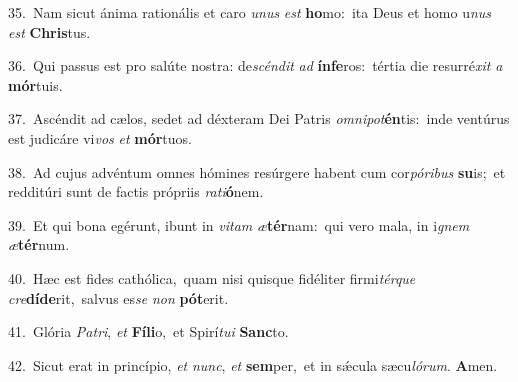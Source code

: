 {\numbfont\textcolor{\numbcolor}{35.}}~Nam sicut ánima rationális et caro \textit{u}\-\textit{nus} \textit{est} \textbf{ho}\-mo:~\star ita Deus et homo u\textit{nus} \textit{est} \textbf{Chris}\-tus.\par
{\numbfont\textcolor{\numbcolor}{36.}}~Qui passus est pro salúte nostra: de\-\textit{scén}\-\textit{dit} \textit{ad} \textbf{ín}\-\textbf{fe}ros:~\star tértia die resurré\textit{xit} \textit{a} \textbf{mór}\-tuis.\par
{\numbfont\textcolor{\numbcolor}{37.}}~Ascéndit ad cælos, sedet ad déxteram Dei Patris \textit{om}\-\textit{ni}\textit{pot}\textbf{én}tis:~\star inde ventúrus est judicáre vi\textit{vos} \textit{et} \textbf{mór}\-tuos.\par
{\numbfont\textcolor{\numbcolor}{38.}}~Ad cujus advéntum omnes hómines resúrgere habent cum cor\-\textit{pó}\-\textit{ri}\textit{bus} \textbf{su}\-is;~\star et redditúri sunt de factis própriis \textit{ra}\-\textit{ti}\textbf{ó}nem.\par
{\numbfont\textcolor{\numbcolor}{39.}}~Et qui bona egérunt, ibunt in \textit{vi}\-\textit{tam} \textit{æ}\-\textbf{tér}nam:~\star qui vero mala, in i\textit{gnem} \textit{æ}\-\textbf{tér}num.\par
{\numbfont\textcolor{\numbcolor}{40.}}~Hæc est fides cathólica,~\dagger quam nisi quisque fidéliter firmi\-\textit{tér}\-\textit{que} \textit{cre}\-\textbf{dí}\textbf{de}rit,~\star salvus es\textit{se} \textit{non} \textbf{pót}\-erit.\par
{\numbfont\textcolor{\numbcolor}{41.}}~Glória \textit{Pa}\-\textit{tri}, \textit{et} \textbf{Fí}\-\textbf{li}o,~\star et Spirí\-\textit{tu}\-\textit{i} \textbf{Sanc}\-to.\par
{\numbfont\textcolor{\numbcolor}{42.}}~Sicut erat in princípio, \textit{et} \textit{nunc}\-, \textit{et} \textbf{sem}\-per,~\star et in sǽcula sæcu\-\textit{ló}\-\textit{rum}. \textbf{A}\-men.\par
